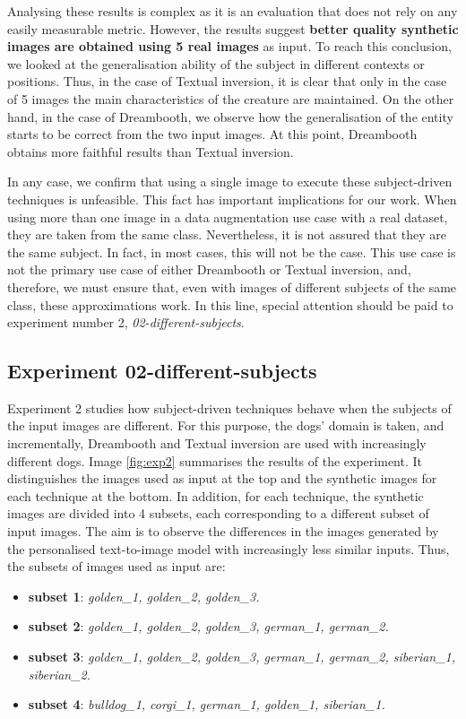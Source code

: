 Analysing these results is complex as it is an evaluation that does not rely on any easily measurable metric. However, the results suggest \textbf{better quality synthetic images are obtained using 5 real images} as input. To reach this conclusion, we looked at the generalisation ability of the subject in different contexts or positions. Thus, in the case of Textual inversion, it is clear that only in the case of 5 images the main characteristics of the creature are maintained. On the other hand, in the case of Dreambooth, we observe how the generalisation of the entity starts to be correct from the two input images. At this point, Dreambooth obtains more faithful results than Textual inversion.

In any case, we confirm that using a single image to execute these subject-driven techniques is unfeasible. This fact has important implications for our work. When using more than one image in a data augmentation use case with a real dataset, they are taken from the same class. Nevertheless, it is not assured that they are the same subject. In fact, in most cases, this will not be the case. This use case is not the primary use case of either Dreambooth or Textual inversion, and, therefore, we must ensure that, even with images of different subjects of the same class, these approximations work. In this line, special attention should be paid to experiment number 2, \textit{02-different-subjects}.

\subsection{Experiment 02-different-subjects} \label{sec: exp-02}

Experiment 2 studies how subject-driven techniques behave when the subjects of the input images are different. For this purpose, the dogs' domain is taken, and incrementally, Dreambooth and Textual inversion are used with increasingly different dogs. Image \ref{fig:exp2} summarises the results of the experiment. It distinguishes the images used as input at the top and the synthetic images for each technique at the bottom. In addition, for each technique, the synthetic images are divided into 4 subsets, each corresponding to a different subset of input images. The aim is to observe the differences in the images generated by the personalised text-to-image model with increasingly less similar inputs. Thus, the subsets of images used as input are:

\begin{itemize}
    \item \textbf{subset 1}: \textit{golden\_1, golden\_2, golden\_3.}
    \item \textbf{subset 2}: \textit{golden\_1, golden\_2, golden\_3, german\_1, german\_2.}
    \item \textbf{subset 3}: \textit{golden\_1, golden\_2, golden\_3, german\_1, german\_2, siberian\_1, siberian\_2.}
    \item \textbf{subset 4}: \textit{bulldog\_1, corgi\_1, german\_1, golden\_1, siberian\_1.}
\end{itemize}

